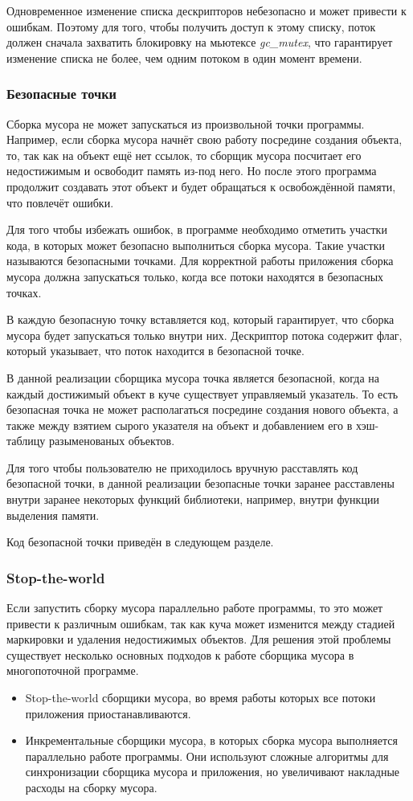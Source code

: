 \documentclass[14pt]{matmex-diploma}
\begin{document}
Одновременное изменение списка дескрипторов небезопасно и может привести к ошибкам.
Поэтому для того, чтобы получить доступ к этому списку, поток должен сначала захватить блокировку на мьютексе \textit{gc\_mutex}, что гарантирует изменение списка не более, чем одним потоком в один момент времени.

\subsubsection{Безопасные точки}
Сборка мусора не может запускаться из произвольной точки программы. Например, если сборка мусора начнёт свою работу посредине создания объекта, то, так как на объект ещё нет ссылок, то сборщик мусора
посчитает его недостижимым и освободит память из-под него. Но после этого программа продолжит создавать этот объект и будет обращаться к освобождённой памяти, что повлечёт ошибки.

Для того чтобы избежать ошибок, в программе необходимо отметить участки кода, в которых может безопасно выполниться сборка мусора. Такие участки называются  безопасными точками. Для корректной работы приложения сборка мусора должна запускаться только, когда все потоки находятся в безопасных точках.

В каждую безопасную точку вставляется код, который гарантирует, что сборка мусора будет запускаться только внутри них. Дескриптор потока содержит флаг, который указывает, что поток находится в безопасной точке.

В данной реализации сборщика мусора точка является безопасной, когда на каждый достижимый объект в куче существует управляемый указатель. То есть безопасная точка не может располагаться посредине создания нового объекта, а также между взятием сырого указателя на объект и добавлением его в хэш-таблицу разыменованых объектов.

Для того чтобы пользователю не приходилось вручную расставлять код безопасной точки, в данной реализации безопасные точки заранее расставлены внутри заранее некоторых функций библиотеки, например, внутри функции выделения памяти.


Код безопасной точки приведён в следующем разделе.

\subsubsection{Stop-the-world} \label{ch:stop-the-world}
Если запустить сборку мусора параллельно работе программы, то это может привести к различным ошибкам, так как куча может изменится между стадией маркировки и удаления недостижимых объектов. Для решения этой проблемы существует несколько основных подходов к работе сборщика мусора в многопоточной программе.
\begin{itemize}
\item Stop-the-world сборщики мусора, во время работы которых все потоки приложения приостанавливаются. 
\item Инкрементальные сборщики мусора, в которых сборка мусора выполняется параллельно работе программы. Они используют сложные алгоритмы для синхронизации сборщика мусора и приложения, но увеличивают накладные расходы на сборку мусора.
\end{itemize}
\end{document}
